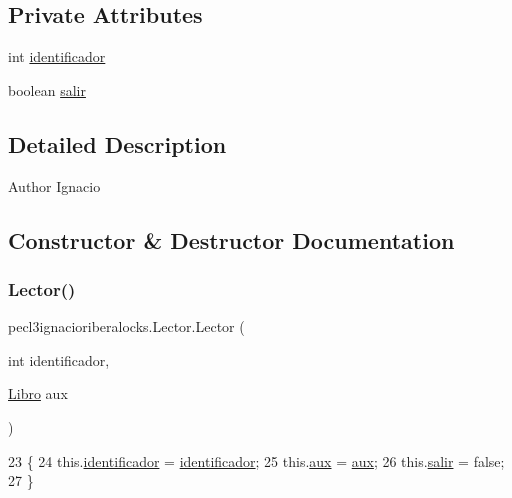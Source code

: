 \subsection*{Private Attributes}
\begin{DoxyCompactItemize}
\item 
int \mbox{\hyperlink{classpecl3ignacioriberalocks_1_1_lector_a1bbc40775f724c5f1b591b67f5902c72}{identificador}}
\item 
boolean \mbox{\hyperlink{classpecl3ignacioriberalocks_1_1_lector_a862abb7c23945623b9c4800951dc5de2}{salir}}
\end{DoxyCompactItemize}


\subsection{Detailed Description}
\begin{DoxyAuthor}{Author}
Ignacio 
\end{DoxyAuthor}


\subsection{Constructor \& Destructor Documentation}
\mbox{\label{classpecl3ignacioriberalocks_1_1_lector_aed6f8b898f2a4cc1b7b4fb96a4b1c1e4}} 
\subsubsection{\texorpdfstring{Lector()}{Lector()}}
{\footnotesize\ttfamily pecl3ignacioriberalocks.\+Lector.\+Lector (\begin{DoxyParamCaption}\item[{int}]{identificador,  }\item[{\mbox{\hyperlink{classpecl3ignacioriberalocks_1_1_libro}{Libro}}}]{aux }\end{DoxyParamCaption})\hspace{0.3cm}{\ttfamily [inline]}}


\begin{DoxyCode}
23      \{
24          this.\mbox{\hyperlink{classpecl3ignacioriberalocks_1_1_lector_a1bbc40775f724c5f1b591b67f5902c72}{identificador}} = \mbox{\hyperlink{classpecl3ignacioriberalocks_1_1_lector_a1bbc40775f724c5f1b591b67f5902c72}{identificador}};
25          this.\mbox{\hyperlink{classpecl3ignacioriberalocks_1_1_lector_a9efbbc039743d8128a3c90cc82743a3b}{aux}} = \mbox{\hyperlink{classpecl3ignacioriberalocks_1_1_lector_a9efbbc039743d8128a3c90cc82743a3b}{aux}};
26          this.\mbox{\hyperlink{classpecl3ignacioriberalocks_1_1_lector_a862abb7c23945623b9c4800951dc5de2}{salir}} = \textcolor{keyword}{false};
27      \}
\end{DoxyCode}


